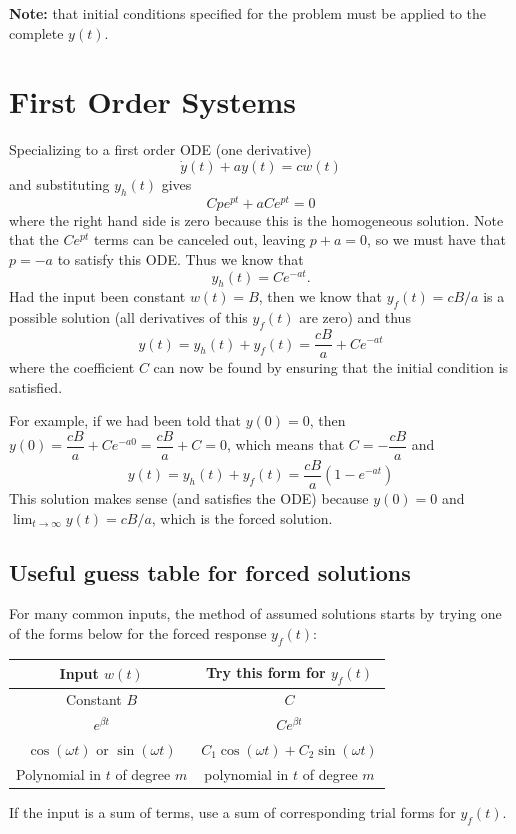 \documentclass[12pt]{article}
\begin{document}
\noindent
\textbf{Note:} that initial conditions specified for the problem must be applied to the complete $y(t)$.

\newpage
\section{First Order Systems}
Specializing to a first order ODE (one derivative) $$\dot y(t) + a y(t) = c w(t)$$ and substituting  $y_h(t)$ gives
$$
Cp e^{pt} + a Ce^{pt} = 0 
$$ 
where the right hand side is zero because this is the homogeneous solution. Note that the $Ce^{pt}$ terms can be canceled out, leaving $p+a=0$, so we must have that $p=-a$ to satisfy this ODE.
Thus we know that
$$
y_h(t) = Ce^{-at}.
$$ 
Had the input been constant $w(t) = B$, then we know that $y_f(t) = cB/a$ is a possible solution (all derivatives of this $y_f(t)$ are zero) and thus
$$
y(t) = y_h(t) + y_f(t) = \dfrac{cB}{a} + Ce^{-at}
$$
where the coefficient $C$ can now be found by ensuring that the initial condition is satisfied.

For example, if we had been told that $y(0)=0$, then $y(0)= \dfrac{cB}{a} + Ce^{-a0} = \dfrac{cB}{a} + C = 0$, which 
means that $C = -\dfrac{cB}{a}$ and
$$
y(t) = y_h(t) + y_f(t) = \dfrac{cB}{a} (1-e^{-at})
$$
This solution makes sense (and satisfies the ODE) because $y(0)=0$ and $\lim_{t \to \infty}y(t) = cB/a$, which is the forced solution.

\newpage
\subsection{Useful guess table for forced solutions}
For many common inputs, the method of assumed solutions starts by trying one of the forms below for the forced response $y_f(t)$:

\begin{center}
\begin{tabular}{|c|c|}
\hline
Input $w(t)$ & Try this form for $y_f(t)$ \\
\hline
Constant $B$ & $C$ \\
\hline
$e^{\beta t}$ & $C e^{\beta t}$ \\
\hline
$\cos(\omega t)$ or $\sin(\omega t)$ & $C_1 \cos(\omega t)+C_2 \sin(\omega t)$ \\
\hline
Polynomial in $t$ of degree $m$ & polynomial in $t$ of degree $m$ \\
\hline
\end{tabular}
\end{center}
If the input is a sum of terms, use a sum of corresponding trial forms for $y_f(t)$.
\end{document}
